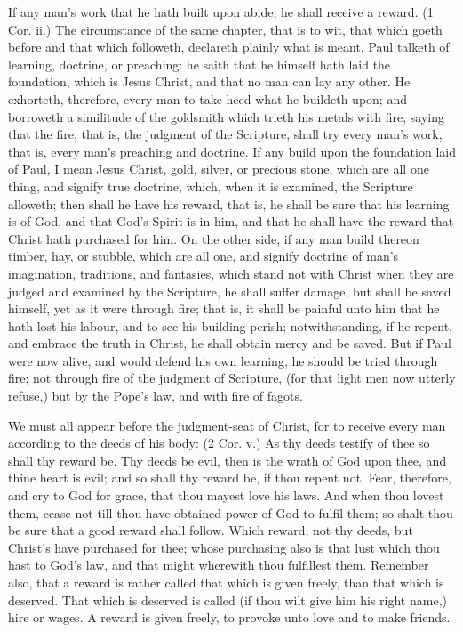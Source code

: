 If any man's work that he hath built upon abide, he 
shall receive a reward. (1 Cor. ii.) The circumstance of 
the same chapter, that is to wit, that which goeth before 
and that which followeth, declareth plainly what is meant. 
Paul talketh of learning, doctrine, or preaching: he saith 
that he himself hath laid the foundation, which is Jesus 
Christ, and that no man can lay any other. He exhorteth,
therefore, every man to take heed what he buildeth 
upon; and borroweth a similitude of the goldsmith which 
trieth his metals with fire, saying that the fire, that is, 
the judgment of the Scripture, shall try every man's work, 
that is, every man's preaching and doctrine. If any 
build upon the foundation laid of Paul, I mean Jesus 
Christ, gold, silver, or precious stone, which are all one 
thing, and signify true doctrine, which, when it is examined,
the Scripture alloweth; then shall he have his reward,
that is, he shall be sure that his learning is of God, 
and that God's Spirit is in him, and that he shall have the 
reward that Christ hath purchased for him. On the other 
side, if any man build thereon timber, hay, or stubble, 
which are all one, and signify doctrine of man's imagination,
traditions, and fantasies, which stand not with Christ 
when they are judged and examined by the Scripture, he 
shall suffer damage, but shall be saved himself, yet as it 
were through fire; that is, it shall be painful unto him 
that he hath lost his labour, and to see his building perish; 
notwithstanding, if he repent, and embrace the truth in 
Christ, he shall obtain mercy and be saved. But if Paul 
were now alive, and would defend his own learning, he 
should be tried through fire; not through fire of the 
judgment of Scripture, (for that light men now utterly 
refuse,) but by the Pope's law, and with fire of fagots. 


We must all appear before the judgment-seat of Christ, 
for to receive every man according to the deeds of his 
body: (2 Cor. v.) As thy deeds testify of thee so shall thy 
reward be. Thy deeds be evil, then is the wrath of God 
upon thee, and thine heart is evil; and so shall thy reward 
be, if thou repent not. Fear, therefore, and cry to God 
for grace, that thou mayest love his laws. And when 
thou lovest them, cease not till thou have obtained power 
of God to fulfil them; so shalt thou be sure that a good 
reward shall follow. Which reward, not thy deeds, but 
Christ's have purchased for thee; whose purchasing also 
is that lust which thou hast to God's law, and that might 
wherewith thou fulfillest them. Remember also, that a 
reward is rather called that which is given freely, than that 
which is deserved. That which is deserved is called (if 
thou wilt give him his right name,) hire or wages. A 
reward is given freely, to provoke unto love and to make 
friends. 

